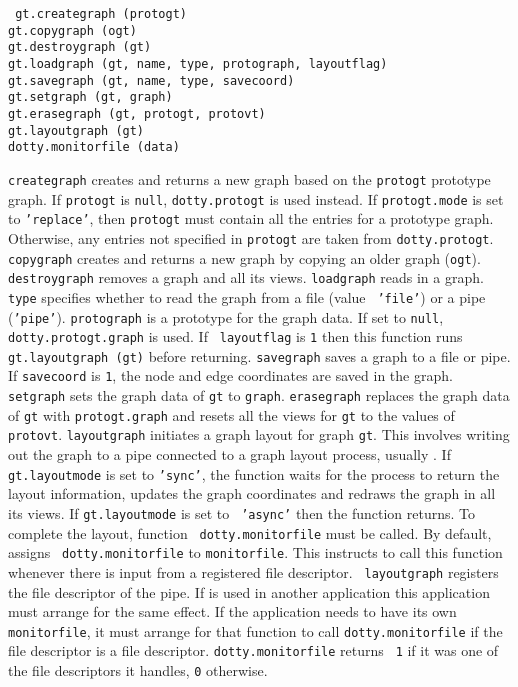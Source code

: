 \begin{flushleft}\tt
gt.creategraph (protogt)\\
gt.copygraph (ogt)\\
gt.destroygraph (gt)\\
gt.loadgraph (gt, name, type, protograph, layoutflag)\\
gt.savegraph (gt, name, type, savecoord)\\
gt.setgraph (gt, graph)\\
gt.erasegraph (gt, protogt, protovt)\\
gt.layoutgraph (gt)\\
dotty.monitorfile (data)\\
\end{flushleft}\vspace{-2\itemsep}
{\tt creategraph} creates and returns a new graph based on the {\tt protogt}
prototype graph. If {\tt protogt} is {\tt null}, {\tt dotty.protogt} is used
instead. If {\tt protogt.mode} is set to {\tt 'replace'}, then {\tt protogt}
must contain all the entries for a prototype graph. Otherwise, any entries not
specified in {\tt protogt} are taken from {\tt dotty.protogt}.  {\tt copygraph}
creates and returns a new graph by copying an older graph ({\tt ogt}). {\tt
destroygraph} removes a graph and all its views.  {\tt loadgraph} reads in a
graph. {\tt type} specifies whether to read the graph from a file (value {\tt
'file'}) or a pipe ({\tt 'pipe'}).  {\tt protograph} is a prototype for the
graph data. If set to {\tt null}, {\tt dotty.protogt.graph} is used. If {\tt
layoutflag} is {\tt 1} then this function runs {\tt gt.layoutgraph (gt)} before
returning. {\tt savegraph} saves a graph to a file or pipe. If {\tt savecoord}
is {\tt 1}, the node and edge coordinates are saved in the graph.  {\tt
setgraph} sets the graph data of {\tt gt} to {\tt graph}. {\tt erasegraph}
replaces the graph data of {\tt gt} with {\tt protogt.graph} and resets all the
views for {\tt gt} to the values of {\tt protovt}. {\tt layoutgraph} initiates
a graph layout for graph {\tt gt}.  This involves writing out the graph to a
pipe connected to a graph layout process, usually {\DOT}.  If {\tt
gt.layoutmode} is set to {\tt 'sync'}, the function waits for the {\DOT}
process to return the layout information, updates the graph coordinates and
redraws the graph in all its views.  If {\tt gt.layoutmode} is set to {\tt
'async'} then the function returns.  To complete the layout, function {\tt
dotty.monitorfile} must be called.  By default, {\DOTTY} assigns {\tt
dotty.monitorfile} to {\tt monitorfile}.  This instructs {\LEFTY} to call this
function whenever there is input from a registered file descriptor. {\tt
layoutgraph} registers the file descriptor of the {\DOT} pipe. If {\DOTTY} is
used in another application this application must arrange for the same
effect. If the application needs to have its own {\tt monitorfile}, it must
arrange for that function to call {\tt dotty.monitorfile} if the file
descriptor is a {\DOT} file descriptor.  {\tt dotty.monitorfile} returns {\tt
1} if it was one of the file descriptors it handles, {\tt 0} otherwise.

